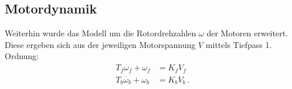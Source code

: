 \documentclass[times, 9pt,twocolumn]{article}
\begin{document}

	\subsection{Motordynamik}

	Weiterhin wurde das Modell um die Rotordrehzahlen $\omega$ der Motoren erweitert. Diese ergeben sich aus der jeweiligen Motorspannung $V$ mittels Tiefpass 1. Ordnung:
	\begin{subequations}
	\begin{align}
	T_f \dot{\omega_f} + \omega_f &= K_f V_f\\
	T_b \dot{\omega_b} + \omega_b &= K_b V_b\, .
	\end{align}
\end{subequations}
\end{document}
